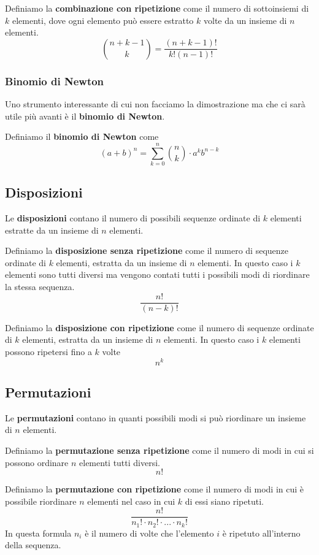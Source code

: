 \begin{definition}
	Definiamo la \textbf{combinazione con ripetizione} come il numero di sottoinsiemi di $k$ elementi,
	dove ogni elemento può essere estratto $k$ volte da un insieme di $n$ elementi.
	\[ \binom{n+k-1}{k} = \frac{(n + k - 1)!}{k! (n-1)!} \]
\end{definition}

\subsubsection{Binomio di Newton}
Uno strumento interessante di cui non facciamo la dimostrazione ma che ci sarà utile più avanti è il
\textbf{binomio di Newton}.

\begin{definition}
	Definiamo il \textbf{binomio di Newton} come
	\[ (a + b)^n = \sum_{k=0}^n \binom{n}{k} \cdot a^k b^{n-k} \]
\end{definition}

\subsection{Disposizioni}
Le \textbf{disposizioni} contano il numero di possibili sequenze ordinate di $k$ elementi estratte da 
un insieme di $n$ elementi.

\begin{definition}
	Definiamo la \textbf{disposizione senza ripetizione} come il numero di sequenze ordinate di $k$
	elementi, estratta da un insieme di $n$ elementi. In questo caso i $k$ elementi sono tutti diversi
	ma vengono contati tutti i possibili modi di riordinare la stessa sequenza.
	\[ \frac{n!}{(n - k)!} \]
\end{definition}

\begin{definition}
	Definiamo la \textbf{disposizione con ripetizione} come il numero di sequenze ordinate di $k$
	elementi, estratta da un insieme di $n$ elementi. In questo caso i $k$ elementi possono ripetersi
	fino a $k$ volte
	\[ n^k \]
\end{definition}

\subsection{Permutazioni}
Le \textbf{permutazioni} contano in quanti possibili modi si può riordinare un insieme di $n$ elementi.

\begin{definition}
	Definiamo la \textbf{permutazione senza ripetizione} come il numero di modi in cui si possono ordinare
	$n$ elementi tutti diversi.
	\[ n! \]
\end{definition}

\begin{definition}
	Definiamo la \textbf{permutazione con ripetizione} come il numero di modi in cui è possibile riordinare
	$n$ elementi nel caso in cui $k$ di essi siano ripetuti.
	\[ \frac{n!}{n_1! \cdot n_2! \cdot ... \cdot n_k!} \]
	In questa formula $n_i$ è il numero di volte che l'elemento $i$ è ripetuto all'interno della sequenza.
\end{definition}

